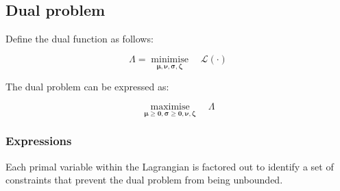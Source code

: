 \documentclass{article}
\DeclareMathOperator*{\minimise}{minimise}
\DeclareMathOperator*{\maximise}{maximise}
\begin{document}
\begin{align}
\begin{split}
	\end{split}
\end{align}

\subsection{Dual problem}
Define the dual function as follows:

\begin{equation}
	\Lambda = \minimise\limits_{\bm{\mu}, \bm{\nu}, \bm{\sigma}, \bm{\zeta}} \quad \mathcal{L}(\cdot)
\end{equation}

The dual problem can be expressed as:

\begin{equation}
	\maximise\limits_{\bm{\mu}\geq \bm{0}, \bm{\sigma}\geq \bm{0}, \bm{\nu}, \bm{\zeta}} \quad \Lambda
\end{equation}

\subsubsection{Expressions}
Each primal variable within the Lagrangian is factored out to identify a set of constraints that prevent the dual problem from being unbounded.

\newcommand{\sumIntervals}{\sum\limits_{\iYear \in \sYears}\sum\limits_{\iScenario \in \sScenarios} \sum\limits_{\iInterval \in \sIntervals}}
\end{document}
